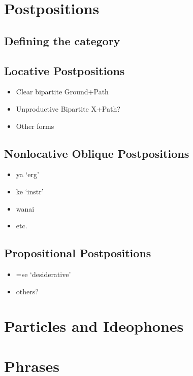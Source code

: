 \documentclass{memoir}
\begin{document}
\chapter{\texorpdfstring{Postpositions \label{postp}}{Postpositions }}

\section{Defining the category}

\section{Locative Postpositions}

\begin{itemize}
\tightlist
\item
  Clear bipartite Ground+Path
\item
  Unproductive Bipartite X+Path?
\item
  Other forms
\end{itemize}

\section{Nonlocative Oblique Postpositions}

\begin{itemize}
\tightlist
\item
  ya `erg'
\item
  ke `instr'
\item
  wanai
\item
  etc.
\end{itemize}

\section{Propositional Postpositions}

\begin{itemize}
\tightlist
\item
  =se `desiderative'
\item
  others?
\end{itemize}

\chapter{\texorpdfstring{Particles and Ideophones
\label{partideo}}{Particles and Ideophones }}

\chapter{\texorpdfstring{Phrases \label{phrases}}{Phrases }}
\end{document}
